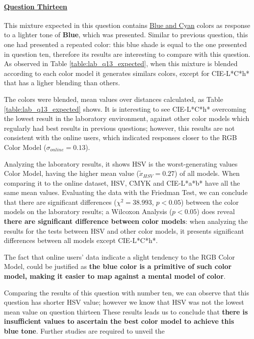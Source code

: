 \paragraph{\ul{Question Thirteen}}
%
This mixture expected in this question contains \ul{Blue and Cyan} colors as response to a lighter tone of \textbf{Blue}, which was presented. Similar to previous question, this one had
presented a repeated color: this blue shade is equal to the one presented in question ten, therefore its results are interesting to compare with this question. As observed in Table
\ref{table:lab_q13_expected}, when this mixture is blended according to each color model it generates similars colors, except for CIE-L*C*h* that has a ligher blending than others. \par
%
The colors were blended, mean values over distances calculated, as Table \ref{table:lab_q13_expected} shows. It is interesting to see CIE-L*C*h* overcoming the lowest result in the laboratory environment, against other
color models which regularly had best results in previous questions; however, this results are not consistent with the online users, which indicated responses closer to the RGB Color Model
($\sigma_{online} = 0.13$). \par
%
Analyzing the laboratory results, it shows HSV is the worst-generating values Color Model, having the higher mean value ($\tilde{x}_{HSV} = 0.27$) of all models. When comparing it to the online dataset,
HSV, CMYK and CIE-L*a*b* have all the same mean values. Evaluating the data with the Friedman Test, we can conclude that there are significant differences ($\chi^2 = 38.993$, $p < 0.05$)
between the color models on the laboratory results; a Wilcoxon Analysis ($p < 0.05$) does reveal \textbf{there are significant difference between color models}: when analyzing the results for the tests between HSV and other
color models, it presents significant differences between all models except CIE-L*C*h*. \par
%
The fact that online users' data indicate a slight tendency to the RGB Color Model, could be justified as \textbf{the blue color is a primitive of such color model, making it easier to map against
a mental model of color}. \par
%
Comparing the results of this question with number ten, we can observe that this question has shorter HSV value; however we know that HSV was not the lowest mean value on question thirteen
These results leads us to conclude that \textbf{there is insufficient values to ascertain the best color model to achieve this blue tone}. Further studies are required to unveil the
